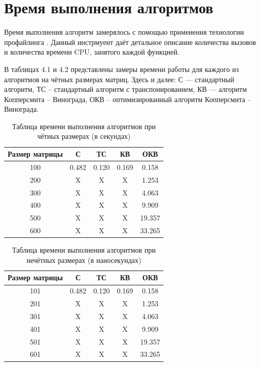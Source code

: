 \documentclass[12pt]{report}
\begin{document}
\section{Время выполнения алгоритмов}
Время выполнения алгоритм замерялось с помощью применения технологии профайлинга \cite{profiling}. Данный инстрмуент даёт детальное описание количества вызовов и количества времени CPU, занятого каждой функцией. \newline

В таблицах 4.1 и 4.2 представлены замеры времени работы для каждого из алгоритмов на чётных размерах матриц. Здесь и далее: С — стандартный алгоритм, ТС -- стандартный алгоритм с транспонированием, КВ — алгоритм Копперсмита -- Винограда, ОКВ -- оптимизированный алгоритм Копперсмита -- Винограда.

\begin{table} [h!]
	\caption{Таблица времени выполнения алгоритмов при чётных размерах (в секундах)}
	\begin{center}
		\begin{tabular}{|c c c c c|} 
		 	\hline
			Размер матрицы & С & ТС & КВ & ОКВ \\  
		 	\hline
		 	100 & 0.482 & 0.120 & 0.169 & 0.158 \\
		 	\hline
		 	200 & X & X & X & 1.253 \\
		 	\hline
			300 & X & X & X & 4.063 \\
			\hline
			400 & X & X & X & 9.909 \\
			\hline
			500 & X & X & X & 19.357 \\
			\hline
			600 & X & X & X & 33.265 \\
			\hline
		\end{tabular}
	\end{center}
\end{table}

\begin{table} [h!]
	\caption{Таблица времени выполнения алгоритмов при нечётных размерах (в наносекундах)}
	\begin{center}
	\begin{tabular}{|c c c c c|} 
		\hline
		Размер матрицы & С & ТС & КВ & ОКВ \\  
		\hline
		101 & 0.482 & 0.120 & 0.169 & 0.158 \\
		\hline
		201 & X & X & X & 1.253 \\
		\hline
		301 & X & X & X & 4.063 \\
		\hline
		401 & X & X & X & 9.909 \\
		\hline
		501 & X & X & X & 19.357 \\
		\hline
		601 & X & X & X & 33.265 \\
		\hline
	\end{tabular}
\end{center}
\end{table}
\end{document}

